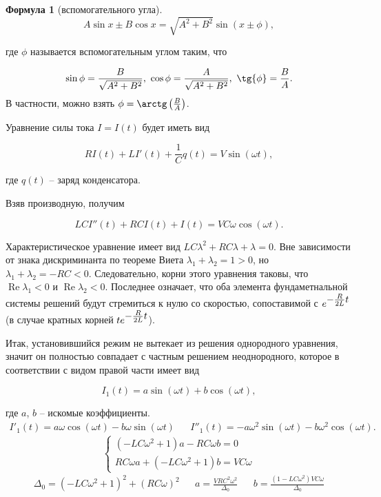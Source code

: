 \documentclass[a5paper,10pt]{article}
\newcommand{\br}[1]{\left(#1\right)}
\renewcommand{\Re}{\operatorname{Re}}
\theoremstyle{definition}
\newtheorem*{formula}{Формула}
\begin{document}
\begin{framed}
\begin{formula}[вспомогательного угла]
$$A \sin{x} \pm B \cos{x} = \sqrt{A^2 + B^2} \sin\br{x \pm \phi},$$

где $\phi$ называется вспомогательным углом таким, что

$$
\sin{\phi} = \frac {B}{\sqrt{A^2 + B^2}},\ 
\cos{\phi} = \frac {A}{\sqrt{A^2 + B^2}},\
\tg{\phi} = \frac {B}{A}.
$$
В частности, можно взять $\phi = \arctg\br{\frac {B}{A}}$.
\end{formula}
\end{framed}


Уравнение силы тока $I = I\br{t}$ будет иметь вид

$$R I\br{t} + L I'\br{t} + \frac{1}{C} q\br{t} = V \sin\br{\omega t},$$

где $q\br{t}$ -- заряд конденсатора.

Взяв производную, получим

$$LC I''\br{t} + RC I\br{t} + I\br{t} = VC\omega \cos\br{\omega t}.$$

Характеристическое уравнение имеет вид $LC \lambda^{2} + RC \lambda + \lambda = 0$. Вне зависимости от знака дискриминанта по теореме Виета $\lambda_{1} + \lambda_{2} = 1 > 0$, но $\lambda_{1} + \lambda_{2} = -RC < 0$. Следовательно, корни этого уравнения таковы, что $\Re{\lambda_{1}} < 0$ и $\Re{\lambda_{2}} < 0$. Последнее означает, что оба элемента фундаметнальной системы решений будут стремиться к нулю со скоростью, сопоставимой с $e^{\mathlarger{-\frac {R}{2L}} \displaystyle{t}}$ (в случае кратных корней $t e^{\mathlarger{-\frac {R}{2L}} \displaystyle{t}}$).

Итак, установившийся режим не вытекает из решения однородного уравнения, значит он полностью совпадает с частным решением неоднородного, которое в соответствии с видом правой части имеет вид

$$I_{1}\br{t} = a \sin\br{\omega t} + b \cos\br{\omega t},$$

где $a$, $b$ -- искомые коэффициенты.
\begin{align*}
    I'_{1}\br{t} = a \omega \cos\br{\omega t} - b \omega \sin\br{\omega t} && I''_{1}\br{t} = -a \omega^2 \sin\br{\omega t} - b \omega^2 \cos\br{\omega t}.
\end{align*}
\begin{equation*}
    \begin{cases}
        \br{-LC\omega^2 + 1} a - RC \omega b = 0 \\
        RC \omega a + \br{-LC\omega^2 + 1} b = VC\omega 
    \end{cases}
\end{equation*}
\begin{align*}
    \Delta_{0} = \br{-LC\omega^2 + 1}^2 + \br{RC\omega}^2 && a = \frac {VRC^2\omega^2} {\Delta_{0}} && b = \frac {\br{1 - LC\omega^2}VC\omega} {\Delta_{0}}
\end{align*}
\end{document}
